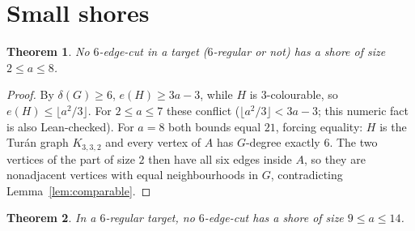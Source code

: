 \documentclass[11pt]{article}
\newtheorem{theorem}{Theorem}[section]
\theoremstyle{remark}
\begin{document}
\section{Small shores}\label{sec:nine}

\begin{theorem}\label{thm:shore8}
No $6$-edge-cut in a target \textup{(}$6$-regular or not\textup{)} has a shore of
size $2\le a\le 8$.
\end{theorem}

\begin{proof}
By $\delta(G)\ge 6$, $e(H)\ge 3a-3$, while $H$ is $3$-colourable, so
$e(H)\le\lfloor a^2/3\rfloor$. For $2\le a\le 7$ these conflict
($\lfloor a^2/3\rfloor<3a-3$; this numeric fact is also Lean-checked). For $a=8$
both bounds equal $21$, forcing equality: $H$ is the Tur\'an graph
$K_{3,3,2}$ and every vertex of $A$ has $G$-degree exactly $6$. The two vertices
of the part of size $2$ then have all six edges inside $A$, so they are
nonadjacent vertices with equal neighbourhoods in $G$, contradicting
Lemma~\ref{lem:comparable}.
\end{proof}

\begin{theorem}\label{thm:shore913}
In a $6$-regular target, no $6$-edge-cut has a shore of size $9\le a\le 14$.
\end{theorem}
\end{document}
